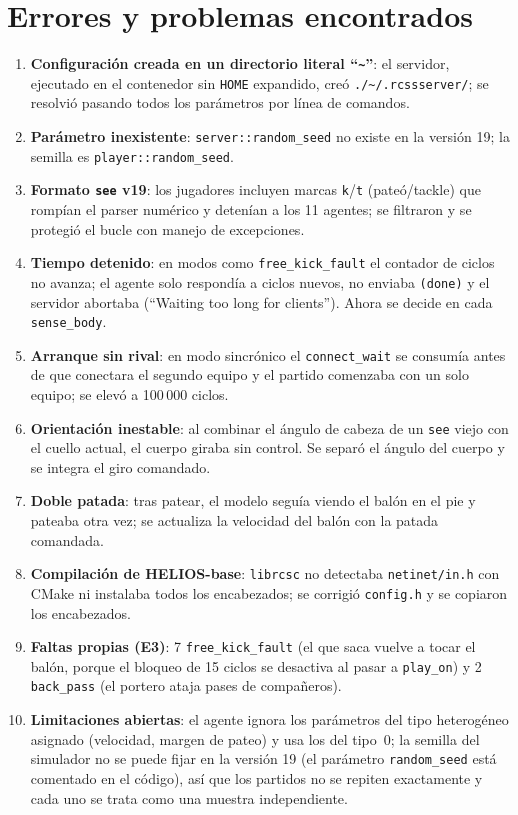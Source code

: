 \documentclass[conference,10pt]{IEEEtran}
\begin{document}
\section{Errores y problemas encontrados}
\begin{enumerate}
\item \textbf{Configuración creada en un directorio literal ``\texttt{\textasciitilde}''}:
el servidor, ejecutado en el contenedor sin \texttt{HOME} expandido, creó
\texttt{./\textasciitilde/.rcssserver/}; se resolvió pasando todos los
parámetros por línea de comandos.
\item \textbf{Parámetro inexistente}: \texttt{server::random\_seed} no existe en
la versión 19; la semilla es \texttt{player::random\_seed}.
\item \textbf{Formato \texttt{see} v19}: los jugadores incluyen marcas
\texttt{k}/\texttt{t} (pateó/tackle) que rompían el parser numérico y
detenían a los 11 agentes; se filtraron y se protegió el bucle con manejo de
excepciones.
\item \textbf{Tiempo detenido}: en modos como \texttt{free\_kick\_fault} el
contador de ciclos no avanza; el agente solo respondía a ciclos nuevos, no
enviaba \texttt{(done)} y el servidor abortaba (``Waiting too long for
clients''). Ahora se decide en cada \texttt{sense\_body}.
\item \textbf{Arranque sin rival}: en modo sincrónico el
\texttt{connect\_wait} se consumía antes de que conectara el segundo equipo y
el partido comenzaba con un solo equipo; se elevó a 100\,000 ciclos.
\item \textbf{Orientación inestable}: al combinar el ángulo de cabeza de un
\texttt{see} viejo con el cuello actual, el cuerpo giraba sin control. Se
separó el ángulo del cuerpo y se integra el giro comandado.
\item \textbf{Doble patada}: tras patear, el modelo seguía viendo el balón en
el pie y pateaba otra vez; se actualiza la velocidad del balón con la patada
comandada.
\item \textbf{Compilación de HELIOS-base}: \texttt{librcsc} no detectaba
\texttt{netinet/in.h} con CMake ni instalaba todos los encabezados; se
corrigió \texttt{config.h} y se copiaron los encabezados.
\item \textbf{Faltas propias (E3)}: 7 \texttt{free\_kick\_fault}
(el que saca vuelve a tocar el balón, porque el bloqueo de 15 ciclos se
desactiva al pasar a \texttt{play\_on}) y 2 \texttt{back\_pass} (el
portero ataja pases de compañeros).
\item \textbf{Limitaciones abiertas}: el agente ignora los parámetros del
tipo heterogéneo asignado (velocidad, margen de pateo) y usa los del tipo~0;
la semilla del simulador no se puede fijar en la versión 19 (el parámetro
\texttt{random\_seed} está comentado en el código), así que los partidos no se
repiten exactamente y cada uno se trata como una muestra independiente.
\end{enumerate}
\end{document}
